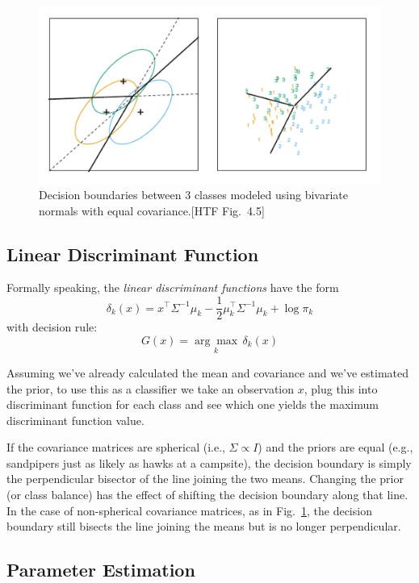 \documentclass[a4paper]{article}
\begin{document}
\begin{figure}
\centering
\includegraphics[width=1.0\textwidth]{fig4_5.png}
\caption{\label{fig:lda3class}Decision boundaries between 3 classes modeled using bivariate normals with equal covariance.[HTF Fig.\ 4.5]}
\end{figure}

\subsection{Linear Discriminant Function}
Formally speaking, the \emph{linear discriminant functions} have the form
$$
\delta_k(x) = x^\top \Sigma^{-1} \mu_{k} - \frac{1}{2} \mu_{k}^{\top} \Sigma^{-1} \mu_{k} + \log \pi_{k}
$$
with decision rule:
$$
G(x) = \underset{k}{\arg\max} \, \delta_{k}(x)
$$

Assuming we've already calculated the mean and covariance and we've estimated the prior, to use this as a classifier we take an observation $x$, plug this into discriminant function for each class and see which one yields the maximum discriminant function value.

If the covariance matrices are spherical (i.e., $\Sigma\propto I$) and the priors are equal (e.g., sandpipers just as likely as hawks at a campsite), the decision boundary is simply the perpendicular bisector of the line joining the two means.  Changing the prior (or class balance) has the effect of shifting the decision boundary along that line.  In the case of non-spherical covariance matrices, as in Fig.\ \ref{fig:lda3class}, the decision boundary still bisects the line joining the means but is no longer perpendicular.

\subsection{Parameter Estimation}
\end{document}
